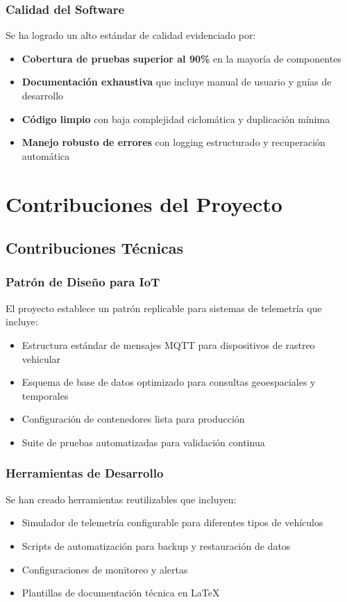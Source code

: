\subsubsection{Calidad del Software}
Se ha logrado un alto estándar de calidad evidenciado por:
\begin{itemize}
    \item \textbf{Cobertura de pruebas superior al 90\%} en la mayoría de componentes
    \item \textbf{Documentación exhaustiva} que incluye manual de usuario y guías de desarrollo
    \item \textbf{Código limpio} con baja complejidad ciclomática y duplicación mínima
    \item \textbf{Manejo robusto de errores} con logging estructurado y recuperación automática
\end{itemize}

\section{Contribuciones del Proyecto}

\subsection{Contribuciones Técnicas}

\subsubsection{Patrón de Diseño para IoT}
El proyecto establece un patrón replicable para sistemas de telemetría que incluye:
\begin{itemize}
    \item Estructura estándar de mensajes MQTT para dispositivos de rastreo vehicular
    \item Esquema de base de datos optimizado para consultas geoespaciales y temporales
    \item Configuración de contenedores lista para producción
    \item Suite de pruebas automatizadas para validación continua
\end{itemize}

\subsubsection{Herramientas de Desarrollo}
Se han creado herramientas reutilizables que incluyen:
\begin{itemize}
    \item Simulador de telemetría configurable para diferentes tipos de vehículos
    \item Scripts de automatización para backup y restauración de datos
    \item Configuraciones de monitoreo y alertas
    \item Plantillas de documentación técnica en LaTeX
\end{itemize}

